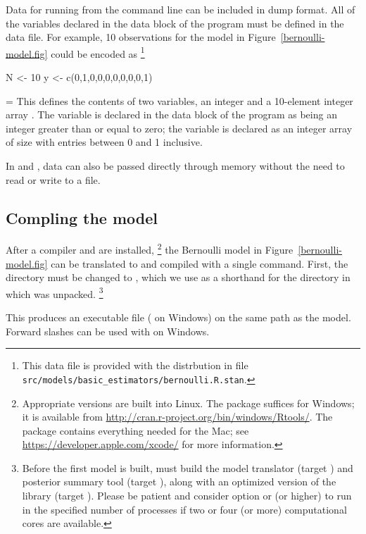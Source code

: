 \documentclass[article]{jss}
\newenvironment{absolutelynopagebreak}
  {\par\nobreak\vfil\penalty0\vfilneg
   \vtop\bgroup}
  {\par\xdef\tpd{\the\prevdepth}\egroup
   \prevdepth=\tpd}
\begin{document}
Data for running  from the command line can be included
in  dump format.  All of the variables declared in the
data block of the  program must be defined in the data
file.  For example, 10 observations for the model in
Figure~\ref{bernoulli-model.fig} could be encoded as%
%
\footnote{This data
file is provided with the  distrbution in file
\nolinkurl{src/models/basic\_estimators/bernoulli.R.stan}.}
%
\begin{absolutelynopagebreak}
\begin{Code}
N <- 10
y <- c(0,1,0,0,0,0,0,0,0,1)
\end{Code}
\end{absolutelynopagebreak}
%
This defines the contents of two variables, an integer  and a
10-element integer array .  The variable  is declared
in the data block of the program as being an integer greater than or
equal to zero;  the variable  is declared as an integer array of size
 with entries between 0 and 1 inclusive.

In  and , data can also be passed directly
through memory without the need to read or write to a file.  

\subsection{Compling the model}

After a  compiler and  are installed,%
%
\footnote{Appropriate versions are built into Linux. The 
  package suffices for Windows; it is available from
  \url{http://cran.r-project.org/bin/windows/Rtools/}.  The
   package contains everything needed for the Mac; see
  \url{https://developer.apple.com/xcode/} for more information.}
%
the Bernoulli model in Figure~\ref{bernoulli-model.fig} can be
translated to  and compiled with a single command.
First, the directory must be changed to , which we use as
a shorthand for the directory in which  was unpacked.%
%
\footnote{Before the first model is built,  must build the
  model translator (target ) and posterior summary tool
  (target ), along with an optimized version of the
   library (target ).  Please be patient
  and consider  option  or  (or higher)
  to run in the specified number of processes if two or four (or more)
  computational cores are available.}
%
\begin{CodeChunk}
\end{CodeChunk}
%
This produces an executable file 
( on Windows) on the same path as the model.
Forward slashes can be used with  on Windows.
\end{document}
